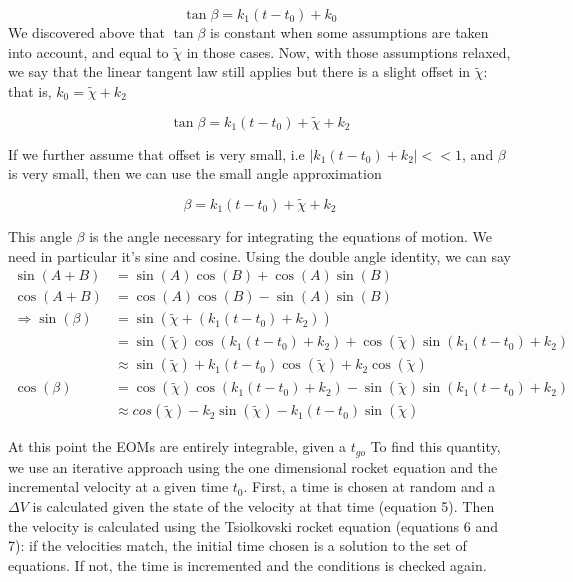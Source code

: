 \documentclass{article}
\begin{document}
\begin{equation*}
\tan\beta = k_1(t - t_0) + k_0
\end{equation*}
We discovered above that $\tan\beta$ is constant when some assumptions are taken into account, and equal to $\tilde\chi$ in those cases. Now, with those assumptions relaxed, 
we say that the linear tangent law still applies but there is a slight offset in $\tilde\chi$: that is, $k_0 = \tilde\chi + k_2$

\begin{equation*}
\tan\beta = k_1(t - t_0) + \tilde\chi + k_2
\end{equation*}

If we further assume that offset is very small, i.e $\left | k_1 (t - t_0) + k_2 \right | << 1$, and $\beta$ is very small, then we can use the small angle approximation

\begin{equation}
\beta = k_1(t - t_0) + \tilde\chi +k_2
\label{eq:four}
\end{equation}

This angle $\beta$ is the angle necessary for integrating the equations of motion. We need in particular it's sine and cosine. Using the double angle identity, we can say
\begin{align*}
\sin(A+B) &= \sin(A)\cos(B) + \cos(A)\sin(B)\\
\cos(A+B) &= \cos(A)\cos(B) - \sin(A)\sin(B)\\
\Rightarrow \sin(\beta) &= \sin(\tilde\chi+ (k_1(t-t_0)+k_2))\\
&=\sin(\tilde\chi)\cos(k_1(t-t_0)+k_2) + \cos(\tilde\chi)\sin(k_1(t-t_0)+k_2)\\
&\approx\sin(\tilde\chi) + k_1(t - t_0)\cos(\tilde\chi) + k_2\cos(\tilde\chi)\\
\cos(\beta) &= \cos(\tilde\chi)\cos(k_1(t-t_0)+k_2) -\sin(\tilde\chi)\sin(k_1(t-t_0)+k_2)\\
&\approx cos(\tilde\chi) - k_2\sin(\tilde\chi) - k_1(t-t_0)\sin(\tilde\chi)
\end{align*}

At this point the EOMs are entirely integrable, given a $t_{go}$ To find this quantity, we use an iterative approach using the one dimensional rocket equation and the
incremental velocity at a given time $t_0$. First, a time is chosen at random and a $\Delta V$ is calculated given the state of the velocity at that time (equation 5). Then
the velocity is calculated using the Tsiolkovski rocket equation (equations 6 and 7): if the velocities match, the initial time chosen is a solution to the set of equations. If not,
the time is incremented and the conditions is checked again. 
\end{document}
